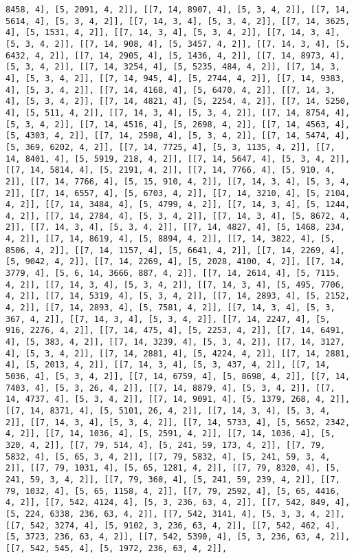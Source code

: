 \documentclass[12pt,fleqn]{article}\usepackage{../../common}
\begin{document}
\begin{verbatim}
8458, 4], [5, 2091, 4, 2]], [[7, 14, 8907, 4], [5, 3, 4, 2]], [[7, 14, 5614, 4], [5, 3, 4, 2]], [[7, 14, 3, 4], [5, 3, 4, 2]], [[7, 14, 3625, 4], [5, 1531, 4, 2]], [[7, 14, 3, 4], [5, 3, 4, 2]], [[7, 14, 3, 4], [5, 3, 4, 2]], [[7, 14, 908, 4], [5, 3457, 4, 2]], [[7, 14, 3, 4], [5, 6432, 4, 2]], [[7, 14, 2905, 4], [5, 1436, 4, 2]], [[7, 14, 8973, 4], [5, 3, 4, 2]], [[7, 14, 3254, 4], [5, 5235, 484, 4, 2]], [[7, 14, 3, 4], [5, 3, 4, 2]], [[7, 14, 945, 4], [5, 2744, 4, 2]], [[7, 14, 9383, 4], [5, 3, 4, 2]], [[7, 14, 4168, 4], [5, 6470, 4, 2]], [[7, 14, 3, 4], [5, 3, 4, 2]], [[7, 14, 4821, 4], [5, 2254, 4, 2]], [[7, 14, 5250, 4], [5, 511, 4, 2]], [[7, 14, 3, 4], [5, 3, 4, 2]], [[7, 14, 8754, 4], [5, 3, 4, 2]], [[7, 14, 4516, 4], [5, 2698, 4, 2]], [[7, 14, 4563, 4], [5, 4303, 4, 2]], [[7, 14, 2598, 4], [5, 3, 4, 2]], [[7, 14, 5474, 4], [5, 369, 6202, 4, 2]], [[7, 14, 7725, 4], [5, 3, 1135, 4, 2]], [[7, 14, 8401, 4], [5, 5919, 218, 4, 2]], [[7, 14, 5647, 4], [5, 3, 4, 2]], [[7, 14, 5814, 4], [5, 2191, 4, 2]], [[7, 14, 7766, 4], [5, 910, 4, 2]], [[7, 14, 7766, 4], [5, 15, 910, 4, 2]], [[7, 14, 3, 4], [5, 3, 4, 2]], [[7, 14, 6557, 4], [5, 6703, 4, 2]], [[7, 14, 3210, 4], [5, 2104, 4, 2]], [[7, 14, 3484, 4], [5, 4799, 4, 2]], [[7, 14, 3, 4], [5, 1244, 4, 2]], [[7, 14, 2784, 4], [5, 3, 4, 2]], [[7, 14, 3, 4], [5, 8672, 4, 2]], [[7, 14, 3, 4], [5, 3, 4, 2]], [[7, 14, 4827, 4], [5, 1468, 234, 4, 2]], [[7, 14, 8619, 4], [5, 8894, 4, 2]], [[7, 14, 3822, 4], [5, 8506, 4, 2]], [[7, 14, 1157, 4], [5, 6641, 4, 2]], [[7, 14, 2269, 4], [5, 9042, 4, 2]], [[7, 14, 2269, 4], [5, 2028, 4100, 4, 2]], [[7, 14, 3779, 4], [5, 6, 14, 3666, 887, 4, 2]], [[7, 14, 2614, 4], [5, 7115, 4, 2]], [[7, 14, 3, 4], [5, 3, 4, 2]], [[7, 14, 3, 4], [5, 495, 7706, 4, 2]], [[7, 14, 5319, 4], [5, 3, 4, 2]], [[7, 14, 2893, 4], [5, 2152, 4, 2]], [[7, 14, 2893, 4], [5, 7581, 4, 2]], [[7, 14, 3, 4], [5, 3, 367, 4, 2]], [[7, 14, 3, 4], [5, 3, 4, 2]], [[7, 14, 2247, 4], [5, 916, 2276, 4, 2]], [[7, 14, 475, 4], [5, 2253, 4, 2]], [[7, 14, 6491, 4], [5, 383, 4, 2]], [[7, 14, 3239, 4], [5, 3, 4, 2]], [[7, 14, 3127, 4], [5, 3, 4, 2]], [[7, 14, 2881, 4], [5, 4224, 4, 2]], [[7, 14, 2881, 4], [5, 2013, 4, 2]], [[7, 14, 3, 4], [5, 3, 437, 4, 2]], [[7, 14, 5036, 4], [5, 3, 4, 2]], [[7, 14, 6759, 4], [5, 8698, 4, 2]], [[7, 14, 7403, 4], [5, 3, 26, 4, 2]], [[7, 14, 8879, 4], [5, 3, 4, 2]], [[7, 14, 4737, 4], [5, 3, 4, 2]], [[7, 14, 9091, 4], [5, 1379, 268, 4, 2]], [[7, 14, 8371, 4], [5, 5101, 26, 4, 2]], [[7, 14, 3, 4], [5, 3, 4, 2]], [[7, 14, 3, 4], [5, 3, 4, 2]], [[7, 14, 5733, 4], [5, 5652, 2342, 4, 2]], [[7, 14, 1036, 4], [5, 2591, 4, 2]], [[7, 14, 1036, 4], [5, 320, 4, 2]], [[7, 79, 514, 4], [5, 241, 59, 173, 4, 2]], [[7, 79, 5832, 4], [5, 65, 3, 4, 2]], [[7, 79, 5832, 4], [5, 241, 59, 3, 4, 2]], [[7, 79, 1031, 4], [5, 65, 1281, 4, 2]], [[7, 79, 8320, 4], [5, 241, 59, 3, 4, 2]], [[7, 79, 360, 4], [5, 241, 59, 239, 4, 2]], [[7, 79, 1032, 4], [5, 65, 1158, 4, 2]], [[7, 79, 2592, 4], [5, 65, 4416, 4, 2]], [[7, 542, 4124, 4], [5, 3, 236, 63, 4, 2]], [[7, 542, 849, 4], [5, 224, 6338, 236, 63, 4, 2]], [[7, 542, 3141, 4], [5, 3, 3, 4, 2]], [[7, 542, 3274, 4], [5, 9102, 3, 236, 63, 4, 2]], [[7, 542, 462, 4], [5, 3723, 236, 63, 4, 2]], [[7, 542, 5390, 4], [5, 3, 236, 63, 4, 2]], [[7, 542, 545, 4], [5, 1972, 236, 63, 4, 2]], 
\end{verbatim}
\end{document}
